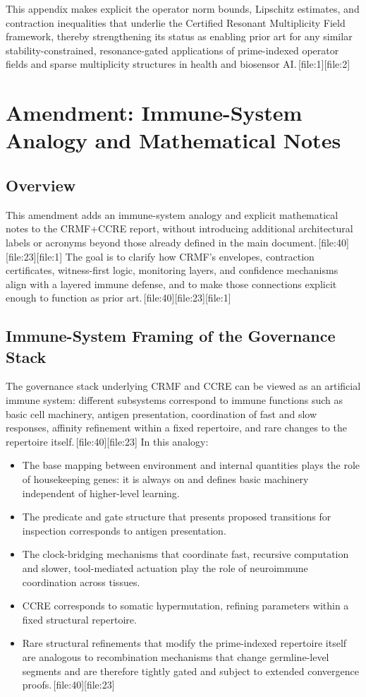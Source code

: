 \documentclass[11pt]{article}
\begin{document}
\bigskip

This appendix makes explicit the operator norm bounds, Lipschitz estimates, and contraction inequalities that underlie the Certified Resonant Multiplicity Field framework, thereby strengthening its status as enabling prior art for any similar stability-constrained, resonance-gated applications of prime-indexed operator fields and sparse multiplicity structures in health and biosensor AI.\,[file:1][file:2]

\section*{Amendment: Immune-System Analogy and Mathematical Notes}

\subsection*{Overview}

This amendment adds an immune-system analogy and explicit mathematical notes to the CRMF+CCRE report, without introducing additional architectural labels or acronyms beyond those already defined in the main document.\,[file:40][file:23][file:1]
The goal is to clarify how CRMF’s envelopes, contraction certificates, witness-first logic, monitoring layers, and confidence mechanisms align with a layered immune defense, and to make those connections explicit enough to function as prior art.\,[file:40][file:23][file:1]

\subsection*{Immune-System Framing of the Governance Stack}

The governance stack underlying CRMF and CCRE can be viewed as an artificial immune system: different subsystems correspond to immune functions such as basic cell machinery, antigen presentation, coordination of fast and slow responses, affinity refinement within a fixed repertoire, and rare changes to the repertoire itself.\,[file:40][file:23]
In this analogy:
\begin{itemize}
  \item The base mapping between environment and internal quantities plays the role of housekeeping genes: it is always on and defines basic machinery independent of higher-level learning.
  \item The predicate and gate structure that presents proposed transitions for inspection corresponds to antigen presentation.
  \item The clock-bridging mechanisms that coordinate fast, recursive computation and slower, tool-mediated actuation play the role of neuroimmune coordination across tissues.
  \item CCRE corresponds to somatic hypermutation, refining parameters within a fixed structural repertoire.
  \item Rare structural refinements that modify the prime-indexed repertoire itself are analogous to recombination mechanisms that change germline-level segments and are therefore tightly gated and subject to extended convergence proofs.\,[file:40][file:23]
\end{itemize}
\end{document}

